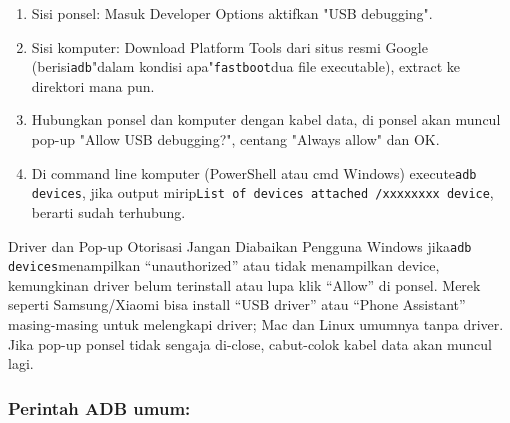 \begin{enumerate}
  \item Sisi ponsel: Masuk Developer Options aktifkan "USB debugging".
  \item Sisi komputer: Download Platform Tools dari situs resmi Google (berisi\texttt{adb}"dalam kondisi apa"\texttt{fastboot}dua file executable), extract ke direktori mana pun.
  \item Hubungkan ponsel dan komputer dengan kabel data, di ponsel akan muncul pop-up "Allow USB debugging?", centang "Always allow" dan OK.
  \item Di command line komputer (PowerShell atau cmd Windows) execute\texttt{adb devices}, jika output mirip\texttt{List of devices attached /\allowbreak  xxxxxxxx device}, berarti sudah terhubung.
\end{enumerate}

\begin{tcbwarn}{Driver dan Pop-up Otorisasi Jangan Diabaikan}
Pengguna Windows jika\texttt{adb devices}menampilkan “unauthorized” atau tidak menampilkan device, kemungkinan driver belum terinstall atau lupa klik “Allow” di ponsel. Merek seperti Samsung/Xiaomi bisa install “USB driver” atau “Phone Assistant” masing-masing untuk melengkapi driver; Mac dan Linux umumnya tanpa driver. Jika pop-up ponsel tidak sengaja di-close, cabut-colok kabel data akan muncul lagi.

\end{tcbwarn}

\subsubsection*{Perintah ADB umum:}

